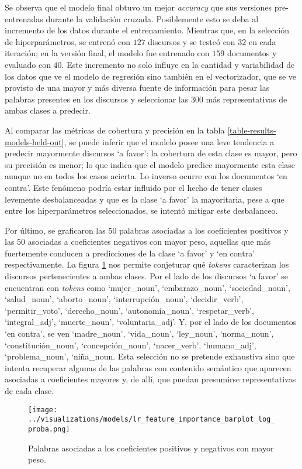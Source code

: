 Se observa que el modelo final obtuvo un mejor \textit{accuracy} que sus
versiones pre-entrenadas durante la validaci\'on cruzada. Posiblemente
esto se deba al incremento de los datos durante el entrenamiento.
Mientras que, en la selecci\'on de hiperpar\'ametros, se entren\'o con $127$ discursos
y se teste\'o con $32$ en cada iteraci\'on; en la versi\'on final, el modelo fue entrenado
con $159$ documentos y evaluado con $40$. Este incremento no solo influye en
la cantidad y variabilidad de los datos que ve el modelo de regresi\'on sino
tambi\'en en el vectorizador, que se ve provisto de una mayor y m\'as diversa fuente
de informaci\'on para pesar las palabras presentes en los discursos y seleccionar
las $300$ m\'as representativas de ambas clases a predecir.
\par
Al comparar las m\'etricas de cobertura y precisi\'on en la tabla
\ref{table-results-models-held-out}, se puede inferir que el modelo posee
una leve tendencia a predecir mayormente discursos `a favor': la cobertura
de esta clase es mayor, pero su precisi\'on es menor; lo que indica que el modelo
predice mayormente esta clase aunque no en todos los casos acierta. Lo inverso
ocurre con los documentos `en contra'. Este fen\'omeno podr\'ia estar influido
por el hecho de tener clases levemente desbalanceadas y que es la clase `a favor'
la mayoritaria, pese a que entre los hiperpar\'ametros seleccionados, se intentó
mitigar este desbalanceo.
\par
Por \'ultimo, se graficaron las $50$ palabras asociadas a los coeficientes positivos
y las $50$ asociadas a coeficientes negativos con mayor peso, aquellas que m\'as
fuertemente conducen a predicciones de la clase `a favor' y `en contra' respectivamente.
La figura \ref{fig-results-models-feature-importance} nos permite conjeturar qu\'e
\textit{tokens} caracterizan los discursos pertenecientes a ambas clases. Por el lado de los
discursos `a favor' se encuentran con \textit{tokens} como `mujer\_noun', `embarazo\_noun',
`sociedad\_noun', `salud\_noun', `aborto\_noun', `interrupción\_noun', `decidir\_verb',
`permitir\_voto', `derecho\_noun', `autonom\'ia\_noun', `respetar\_verb', `integral\_adj',
`muerte\_noun', `voluntaria\_adj'. Y, por el lado de los
documentos `en contra', se ven `madre\_noun', `vida\_noun', `ley\_noun', `norma\_noun',
`constituci\'on\_noun', `concepci\'on\_noun', `nacer\_verb',
`humano\_adj', `problema\_noun', `niña\_noun. Esta selecci\'on no se pretende exhaustiva
sino que intenta recuperar algunas de las palabras con contenido sem\'antico que aparecen
asociadas a coeficientes mayores y, de all\'i, que puedan presumirse representativas
de cada clase. 

\begin{figure}[h!]
    \centering
    \texttt{[image: ../visualizations/models/lr\_feature\_importance\_barplot\_log\_proba.png]}
    \caption{Palabras asociadas a los coeficientes positivos y negativos con mayor peso.}
    \label{fig-results-models-feature-importance}
\end{figure}